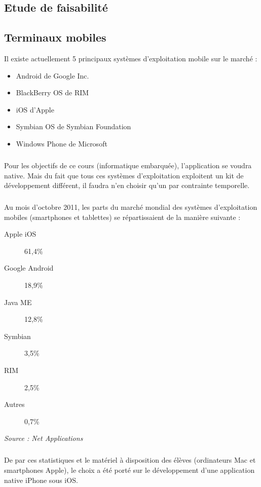 \documentclass[a4paper,12pt]{report}
\begin{document}
\begin{onehalfspace}
	\chapter*{Etude de faisabilité}
	
	\section*{Terminaux mobiles}
	
	Il existe actuellement 5 principaux systèmes d'exploitation mobile sur le marché :
	\begin{itemize}
		\item Android de Google Inc.
		\item BlackBerry OS de RIM
		\item iOS d'Apple
		\item Symbian OS de Symbian Foundation
		\item Windows Phone de Microsoft
	\end{itemize}
	
	\paragraph*{}
	Pour les objectifs de ce cours (informatique embarquée), l'application se voudra native. Mais du fait que tous ces systèmes d'exploitation exploitent un kit de développement différent, il faudra n'en choisir qu'un par contrainte temporelle.
	
	\paragraph*{}
	Au mois d'octobre 2011, les parts du marché mondial des systèmes d'exploitation mobiles (smartphones et tablettes) se répartissaient de la manière suivante :
	\begin{description}
		\item[Apple iOS] 61,4\%
		\item[Google Android] 18,9\%
		\item[Java ME] 12,8\%
		\item[Symbian] 3,5\%
		\item[RIM] 2,5\%
		\item[Autres] 0,7\%
	\end{description}
	\emph{Source : Net Applications}
	
	\paragraph*{}
	De par ces statistiques et le matériel à disposition des élèves (ordinateurs Mac et smartphones Apple), le choix a été porté sur le développement d'une application native iPhone sous iOS.
	

\end{onehalfspace}
\end{document}
